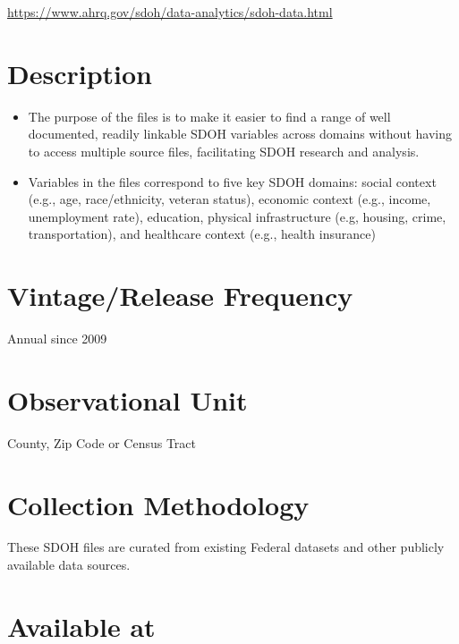 \documentclass[
]{book}
\providecommand{\tightlist}{%
  \setlength{\itemsep}{0pt}\setlength{\parskip}{0pt}}
\begin{document}
\url{https://www.ahrq.gov/sdoh/data-analytics/sdoh-data.html}

\hypertarget{description-81}{%
\section{Description}\label{description-81}}

\begin{itemize}
\tightlist
\item
  The purpose of the files is to make it easier to find a range of well documented, readily linkable SDOH variables across domains without having to access multiple source files, facilitating SDOH research and analysis.
\item
  Variables in the files correspond to five key SDOH domains: social context (e.g., age, race/ethnicity, veteran status), economic context (e.g., income, unemployment rate), education, physical infrastructure (e.g, housing, crime, transportation), and healthcare context (e.g., health insurance)
\end{itemize}

\hypertarget{vintagerelease-frequency-81}{%
\section{Vintage/Release Frequency}\label{vintagerelease-frequency-81}}

Annual since 2009

\hypertarget{observational-unit-81}{%
\section{Observational Unit}\label{observational-unit-81}}

County, Zip Code or Census Tract

\hypertarget{collection-methodology-81}{%
\section{Collection Methodology}\label{collection-methodology-81}}

These SDOH files are curated from existing Federal datasets and other publicly available data sources.

\hypertarget{available-at-81}{%
\section{Available at}\label{available-at-81}}
\end{document}
